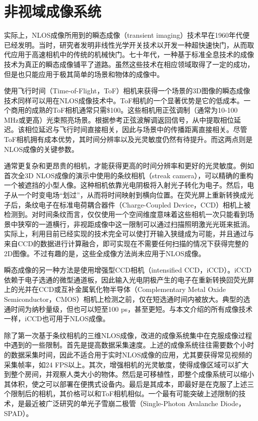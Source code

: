 \documentclass[master]{shtthesis}             %
\begin{document}
\section{非视域成像系统}\label{sec:img_sys}

实际上，NLOS成像所用到的瞬态成像（transient imaging）技术早在1960年代便已经发明。当时，研究者发明非线性光学开关技术以开发一种超快速快门，从而取代应用于高速相机中的传统的机械快门。七十年代，一种基于标准全息技术的成像技术为真正的瞬态成像铺平了道路\citep{faccio2018trillion,hariharan2002basics}。虽然这些技术在相应领域取得了一定的成功，但是也只能应用于极其简单的场景和物体的成像中。

使用飞行时间（Time-of-Flight，ToF）相机来获得一个场景的3D图像的瞬态成像技术同样可以用在NLOS成像技术中\citep{kadambi2013coded,kadambi2013coded,peters2015solving}。ToF相机的一个显著优势是它的低成本。一个商用的成熟的ToF相机通常只需\$100。这些相机用正弦调制（通常为10-100 MHz或更高）光束照亮场景。根据参考正弦波解调返回信号，从中提取相位延迟。该相位延迟与飞行时间直接相关，因此与场景中的传播距离直接相关\citep{jarabo2017recent}。尽管ToF相机拥有成本优势，其时间分辨率以及光灵敏度仍然有待提升。而这两点则是NLOS成像的关键参数。

通常更复杂和更昂贵的相机，才能获得更高的时间分辨率和更好的光灵敏度。例如首次全3D NLOS成像的演示中使用的条纹相机（streak camera），可以精确的重构一个被遮挡的小型人像\citep{Velten2012}。这种相机依靠光电阴极将入射光子转化为电子。然后，电子从一个时变电场“划过”，从而将时间映射到横向位置。在荧光屏上重新转换成光子后，条纹电子在标准电荷耦合器件（Charge-Coupled Device，CCD）相机上被检测到。对时间条纹而言，仅仅使用一个空间维度意味着这些相机一次只能看到场景中狭窄的一道横行，非视距成像中这一限制可以通过扫描照明激光光斑来抵消\citep{velten2013femto}。实际上，利用目前已经实现的技术完全可以使打开输入狭缝成为可能，并且通过与来自CCD的数据进行计算融合，即可实现在不需要任何扫描的情况下获得完整的2D图像\citep{gao2014single,mikami2016ultrafast,zhu2016space}。不过有趣的是，这些全成像方法尚未应用于NLOS成像。

瞬态成像的另一种方法是使用增强型CCD相机（intensified CCD，iCCD）。iCCD依赖于电子选通的微型通道板，因此输入光电阴极产生的电子在重新转换回荧光屏上的光并在CCD或互补金属氧化物半导体（Complementary Metal Oxide Semiconductor，CMOS）相机上检测之前，仅在短选通时间内被放大。典型的选通时间为纳秒量级，但也可以短至100 ps，甚至更短。与本文介绍的所有成像技术一样，iCCD也可用于NLOS成像\citep{laurenzis2014nonline}。

除了第一次基于条纹相机的三维NLOS成像，改进的成像系统集中在克服成像过程中遇到的一些限制。首先是提高数据采集速度。上述的成像系统往往需要数个小时的数据采集时间，因此不适合用于实时NLOS成像的应用，尤其要获得常见视频的采集帧率，如24 FPS以上\citep{read2000restoration}。其次，增强相机的光灵敏度，使得成像区域可以扩大到整个房间，并观察人类大小的物体。然后是可移植性，即整个成像系统可以缩小其体积，使之可以部署在便携式设备内。最后是其成本，即最好是在克服了上述三个限制后的相机，其价格可以和ToF相机相似。一个最有可能突破上述限制的技术，是最近被广泛研究的单光子雪崩二极管（Single-Photon Avalanche Diode，SPAD）。
\end{document}
